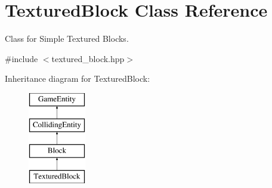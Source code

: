 \hypertarget{class_textured_block}{}\section{Textured\+Block Class Reference}
\label{class_textured_block}


Class for Simple Textured Blocks.  




{\ttfamily \#include $<$textured\+\_\+block.\+hpp$>$}

Inheritance diagram for Textured\+Block\+:\begin{figure}[H]
\begin{center}
\leavevmode
\includegraphics[height=4.000000cm]{class_textured_block}
\end{center}
\end{figure}
